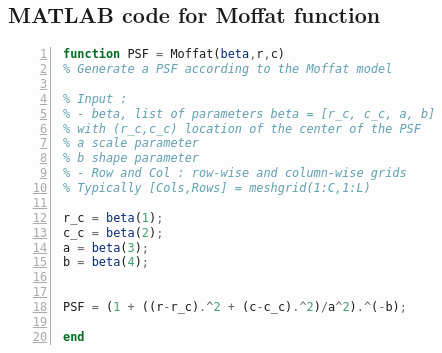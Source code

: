 \begin{appendices}

\section{MATLAB code for Moffat function}
\label{sec:appendix matlab Moffat}
\begin{lstlisting}[frame=single, language=Octave, numbers=left]
function PSF = Moffat(beta,r,c)
% Generate a PSF according to the Moffat model

% Input :
% - beta, list of parameters beta = [r_c, c_c, a, b]
% with (r_c,c_c) location of the center of the PSF
% a scale parameter
% b shape parameter
% - Row and Col : row-wise and column-wise grids
% Typically [Cols,Rows] = meshgrid(1:C,1:L)

r_c = beta(1);
c_c = beta(2);
a = beta(3);
b = beta(4);


PSF = (1 + ((r-r_c).^2 + (c-c_c).^2)/a^2).^(-b);

end
\end{lstlisting}

\end{appendices}
